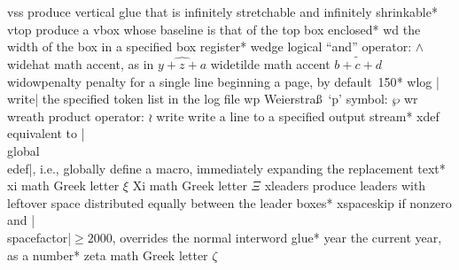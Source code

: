 \capcs vss {produce vertical glue that is infinitely stretchable and 
   infinitely shrinkable}*{}
\capcs vtop {produce a vbox whose baseline is that of the top box enclosed}*{}
\capcs wd {the width of the box in a specified box register}*{}
\capcs wedge {logical ``and'' operator: $\wedge$}{}{}
\capcs widehat {math accent, as in $\widehat {y+z+a}$}{}{}
\capcs widetilde {math accent $\widetilde {b+c+d}$}{}{}
\capcs widowpenalty {penalty for a single line beginning a page, 
   by default~150}*{}
\capcs wlog {|\\write| the specified token list in the log file}{}{}
\capcs wp {Weierstra\ss\ `p' symbol: $\wp$}{}{}
\capcs wr {wreath product operator: $\wr$}{}{}
\capcs write {write a line to a specified output stream}*{}
\capcs xdef {equivalent to |\\global\\edef|, i.e., globally define a
   macro, immediately expanding the replacement text}*{}
\capcs xi {math Greek letter $\xi$}{}{}
\capcs Xi {math Greek letter $\Xi$}{}{}
\capcs xleaders {produce leaders with leftover space distributed equally
   between the leader boxes}*{}
\capcs xspaceskip {if nonzero and |\\spacefactor|${}\ge2000$, 
   overrides the normal interword glue}*{}
\capcs year {the current year, as a number}*{}
\capcs zeta {math Greek letter $\zeta$}{}{}

\endcapsum
\endchapter
\byebye
